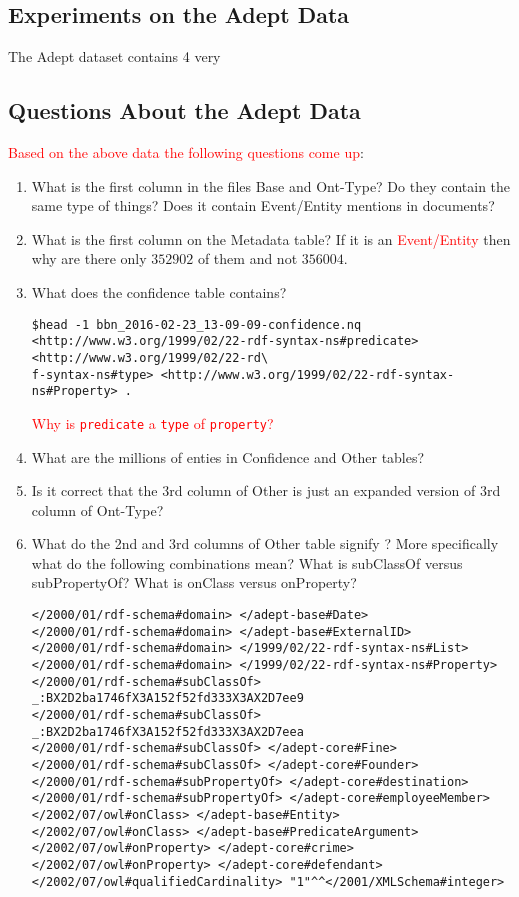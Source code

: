 \documentclass{tufte-handout}
\newcommand{\alert}[1]{\textcolor{red}{#1}}
\begin{document}
\subsection{Experiments on the Adept Data}
\label{sec:exper-adept-data}
The Adept dataset contains 4 very

\subsection{Questions About the Adept Data}
\label{sec:quest-about-adept}

\alert{Based on the above data the following questions come up}:
\begin{enumerate}
\item What is the first column in the files Base and Ont-Type? Do they contain
  the same type of things? Does it contain Event/Entity mentions in documents?
\item What is the first column on the Metadata table? If it is an
  \alert{Event/Entity} then why are there only $352902$ of them and not
  $356004$.
\item What does the confidence table contains?
\begin{verbatim}
$head -1 bbn_2016-02-23_13-09-09-confidence.nq
<http://www.w3.org/1999/02/22-rdf-syntax-ns#predicate> <http://www.w3.org/1999/02/22-rd\
f-syntax-ns#type> <http://www.w3.org/1999/02/22-rdf-syntax-ns#Property> .
\end{verbatim}
\alert{Why is \texttt{predicate} a \texttt{type} of \texttt{property}?}
\item What are the millions of enties in Confidence and Other tables?
\item Is it correct that the 3rd column of Other is just an expanded version of
  3rd column of Ont-Type?
\item What do the 2nd and 3rd columns of Other table signify ? More specifically
  what do the following combinations mean? What is subClassOf versus
  subPropertyOf? What is onClass versus onProperty?
\begin{verbatim}
</2000/01/rdf-schema#domain> </adept-base#Date>
</2000/01/rdf-schema#domain> </adept-base#ExternalID>
</2000/01/rdf-schema#domain> </1999/02/22-rdf-syntax-ns#List>
</2000/01/rdf-schema#domain> </1999/02/22-rdf-syntax-ns#Property>
</2000/01/rdf-schema#subClassOf> _:BX2D2ba1746fX3A152f52fd333X3AX2D7ee9
</2000/01/rdf-schema#subClassOf> _:BX2D2ba1746fX3A152f52fd333X3AX2D7eea
</2000/01/rdf-schema#subClassOf> </adept-core#Fine>
</2000/01/rdf-schema#subClassOf> </adept-core#Founder>
</2000/01/rdf-schema#subPropertyOf> </adept-core#destination>
</2000/01/rdf-schema#subPropertyOf> </adept-core#employeeMember>
</2002/07/owl#onClass> </adept-base#Entity>
</2002/07/owl#onClass> </adept-base#PredicateArgument>
</2002/07/owl#onProperty> </adept-core#crime>
</2002/07/owl#onProperty> </adept-core#defendant>
</2002/07/owl#qualifiedCardinality> "1"^^</2001/XMLSchema#integer>
\end{verbatim}

\end{enumerate}
\end{document}
